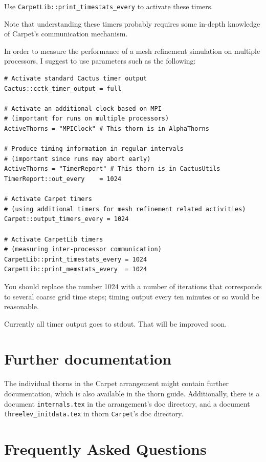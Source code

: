 Use {\tt CarpetLib::print\_timestats\_every} to activate these timers.

Note that understanding  these timers probably requires some in-depth
knowledge of Carpet's communication mechanism.

In order to measure the performance of a mesh refinement simulation  on multiple processors, I suggest to use parameters such as the  following:

\begin{verbatim}
# Activate standard Cactus timer output
Cactus::cctk_timer_output = full

# Activate an additional clock based on MPI
# (important for runs on multiple processors)
ActiveThorns = "MPIClock" # This thorn is in AlphaThorns

# Produce timing information in regular intervals
# (important since runs may abort early)
ActiveThorns = "TimerReport" # This thorn is in CactusUtils
TimerReport::out_every    = 1024

# Activate Carpet timers
# (using additional timers for mesh refinement related activities)
Carpet::output_timers_every = 1024

# Activate CarpetLib timers
# (measuring inter-processor communication)
CarpetLib::print_timestats_every = 1024
CarpetLib::print_memstats_every  = 1024
\end{verbatim}

You should replace the number 1024 with a number of iterations that  corresponds to several coarse grid time steps; timing output every  ten minutes or so would be reasonable.

Currently all timer output goes to stdout.  That will be improved soon.

\section{Further documentation}

The individual thorns in the Carpet arrangement might contain further
documentation, which is also available in the thorn guide.
Additionally, there is a document \texttt{internals.tex} in the
arrangement's doc directory, and a document
\texttt{threelev\_initdata.tex} in thorn \texttt{Carpet}'s doc
directory.


\section{Frequently Asked Questions}
\label{sec:faq}

